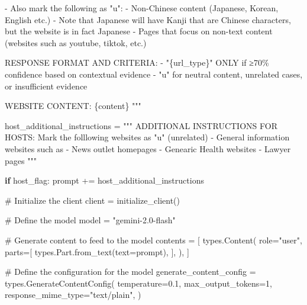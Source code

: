\documentclass[
  titlepage]{article}
\newenvironment{Shaded}{\begin{snugshade}}{\end{snugshade}}
\newcommand{\CommentTok}[1]{\textcolor[rgb]{0.37,0.37,0.37}{#1}}
\newcommand{\ControlFlowTok}[1]{\textcolor[rgb]{0.00,0.23,0.31}{\textbf{#1}}}
\newcommand{\DecValTok}[1]{\textcolor[rgb]{0.68,0.00,0.00}{#1}}
\newcommand{\FloatTok}[1]{\textcolor[rgb]{0.68,0.00,0.00}{#1}}
\newcommand{\NormalTok}[1]{\textcolor[rgb]{0.00,0.23,0.31}{#1}}
\newcommand{\OperatorTok}[1]{\textcolor[rgb]{0.37,0.37,0.37}{#1}}
\newcommand{\SpecialCharTok}[1]{\textcolor[rgb]{0.37,0.37,0.37}{#1}}
\newcommand{\SpecialStringTok}[1]{\textcolor[rgb]{0.13,0.47,0.30}{#1}}
\newcommand{\StringTok}[1]{\textcolor[rgb]{0.13,0.47,0.30}{#1}}
\begin{document}
\begin{Shaded}
\begin{Highlighting}[]
\SpecialStringTok{    {-} Also mark the following as "u":}
\SpecialStringTok{        {-} Non{-}Chinese content (Japanese, Korean, English etc.)}
\SpecialStringTok{            {-} Note that Japanese will have Kanji that are Chinese }
\SpecialStringTok{            characters, but the website is in fact Japanese}
\SpecialStringTok{        {-} Pages that focus on non{-}text content (websites such as youtube, tiktok, etc.)}

\SpecialStringTok{    RESPONSE FORMAT AND CRITERIA:}
\SpecialStringTok{    {-} "}\SpecialCharTok{\{}\NormalTok{url\_type}\SpecialCharTok{\}}\SpecialStringTok{" ONLY if ≥70\% confidence based on contextual evidence}
\SpecialStringTok{    {-} "u" for neutral content, unrelated cases, or insufficient evidence}

\SpecialStringTok{    WEBSITE CONTENT:}
\SpecialStringTok{    }\SpecialCharTok{\{}\NormalTok{content}\SpecialCharTok{\}}
\SpecialStringTok{    """}

\NormalTok{    host\_additional\_instructions }\OperatorTok{=} \StringTok{"""}
\StringTok{    ADDITIONAL INSTRUCTIONS FOR HOSTS:}
\StringTok{    Mark the folllowing websites as "u" (unrelated)}
\StringTok{    {-} General information websites such as }
\StringTok{        {-} News outlet homepages}
\StringTok{        {-} Genearic Health websites}
\StringTok{        {-} Lawyer pages }
\StringTok{    """}

    \ControlFlowTok{if}\NormalTok{ host\_flag:}
\NormalTok{        prompt }\OperatorTok{+=}\NormalTok{ host\_additional\_instructions}

    \CommentTok{\# Initialize the client}
\NormalTok{    client }\OperatorTok{=}\NormalTok{ initialize\_client()}

    \CommentTok{\# Define the model }
\NormalTok{    model }\OperatorTok{=} \StringTok{"gemini{-}2.0{-}flash"}

    \CommentTok{\# Generate content to feed to the model}
\NormalTok{    contents }\OperatorTok{=}\NormalTok{ [}
\NormalTok{        types.Content(}
\NormalTok{            role}\OperatorTok{=}\StringTok{"user"}\NormalTok{,}
\NormalTok{            parts}\OperatorTok{=}\NormalTok{[}
\NormalTok{                types.Part.from\_text(text}\OperatorTok{=}\NormalTok{prompt),}
\NormalTok{            ],}
\NormalTok{        ),}
\NormalTok{    ]}

    \CommentTok{\# Define the configuration for the model}
\NormalTok{    generate\_content\_config }\OperatorTok{=}\NormalTok{ types.GenerateContentConfig(}
\NormalTok{        temperature}\OperatorTok{=}\FloatTok{0.1}\NormalTok{,}
\NormalTok{        max\_output\_tokens}\OperatorTok{=}\DecValTok{1}\NormalTok{,}
\NormalTok{        response\_mime\_type}\OperatorTok{=}\StringTok{"text/plain"}\NormalTok{,}
\NormalTok{    )}


\end{Highlighting}
\end{Shaded}
\end{document}
